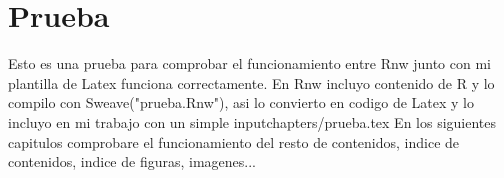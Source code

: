 \chapter{Prueba}
\label{cha:prueba}

Esto es una prueba para comprobar el funcionamiento entre Rnw junto con mi plantilla de Latex funciona correctamente. 
En Rnw incluyo contenido de R y lo compilo con Sweave("prueba.Rnw"), asi lo convierto en codigo de Latex y lo incluyo en mi trabajo con un simple input{chapters/prueba.tex}
En los siguientes capitulos comprobare el funcionamiento del resto de contenidos, indice de contenidos, indice de figuras, imagenes...
